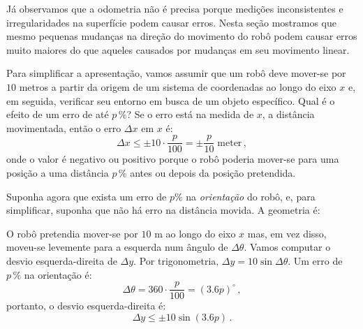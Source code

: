 Já observamos que a odometria não é precisa porque medições inconsistentes e irregularidades na superfície podem causar erros. Nesta seção mostramos que mesmo pequenas mudanças na direção do movimento do robô podem causar erros muito maiores do que aqueles causados por mudanças em seu movimento linear.

Para simplificar a apresentação, vamos assumir que um robô deve mover-se por $10$ metros a partir da origem de um sistema de coordenadas ao longo do eixo $x$ e, em seguida, verificar seu entorno em busca de um objeto específico. Qual é o efeito de um erro de até $p\,\%$? Se o erro está na medida de $x$, a distância movimentada, então o erro $\Delta x$ em $x$ é:
\[\Delta x \leq \pm 10\cdot\frac{p}{100} = \pm\frac{p}{10}\; \textrm{meter}\,,\]
onde o valor é negativo ou positivo porque o robô poderia mover-se para uma posição a uma distância $p\,\%$ antes ou depois da posição pretendida.

Suponha agora que exista um erro de $p\%$ na \emph{orientação} do robô, e, para simplificar, suponha que não há erro na distância movida. A geometria é:
\begin{center}
\end{center}
O robô pretendia mover-se por $10$ m ao longo do eixo $x$ mas, em vez disso, moveu-se levemente para a esquerda num ângulo de $\Delta\theta$. Vamos computar o desvio esquerda-direita de $\Delta y$. Por trigonometria, $\Delta y = 10\sin \Delta\theta$. Um erro de $p\,\%$ na orientação é:
\[
\Delta\theta=360\cdot\frac{p}{100}=(3.6p)^\circ\,,
\]
portanto, o desvio esquerda-direita é:
\[
\Delta y \leq \pm 10 \sin (3.6p)\,.
\]


